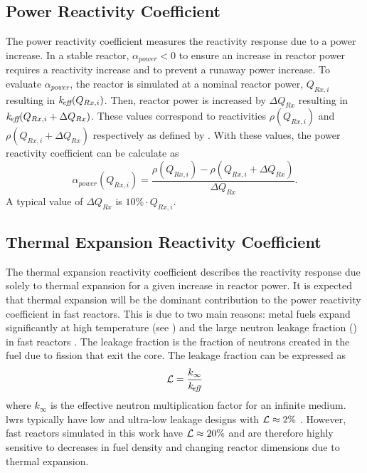   \subsection{Power Reactivity Coefficient}
  \label{sec:power_reactivity_coefficient}
    The power reactivity coefficient measures the reactivity response due to a
    power increase. In a stable reactor, $\alpha_{power} < 0$ to ensure an
    increase in reactor power requires a reactivity increase and to prevent a
    runaway power increase. To evaluate $\alpha_{power}$, the reactor is
    simulated at a nominal reactor power, $Q_{Rx,i}$ resulting in
    $k_{\!\mbox{\scriptsize \em eff}}(Q_{Rx,i})$. Then, reactor power is increased by $\Delta Q_{Rx}$
    resulting in $k_{\!\mbox{\scriptsize \em eff}}(Q_{Rx,i} + \Delta Q_{Rx})$. These \keff values
    correspond to reactivities $\rho(Q_{Rx,i})$ and ${\rho(Q_{Rx,i} + \Delta
    Q_{Rx})}$ respectively as defined by . With these
    values, the power reactivity coefficient can be calculate as
    \begin{equation}
      \label{eq:power_reactivity_coefficient}
      \alpha_{power}(Q_{Rx,i}) = \frac{\rho(Q_{Rx,i}) - \rho(Q_{Rx,i} + 
        \Delta Q_{Rx})} {\Delta Q_{Rx}}.
    \end{equation}
    A typical value of $\Delta Q_{Rx}$ is $10\% \cdot Q_{Rx,i}$.

  \subsection{Thermal Expansion Reactivity Coefficient}
  \label{sec:thermal_expansion_reactivity_coefficent}
    The thermal expansion reactivity coefficient describes the reactivity 
    response due solely to thermal expansion for a given increase in reactor 
    power. It is expected that thermal expansion will be the dominant 
    contribution to the power reactivity coefficient in fast reactors. This is 
    due to two main reasons: metal fuels expand significantly at high 
    temperature (see ) and the large neutron leakage 
    fraction (\leakage) in fast reactors \cite{PlentifulEnergy}. The leakage 
    fraction is the fraction of neutrons created in the fuel due to fission that 
    exit the core. The leakage fraction can be expressed as
    \begin{equation}
      \label{eq:leakage}
      \mathcal{L} = \frac{k_{\infty}}{k_{\!\mbox{\scriptsize \em eff}}}
    \end{equation}
    where $k_{\infty}$ is the effective neutron multiplication factor for an
    infinite medium. \glspl{lwr} typically have low and ultra-low leakage
    designs with $\mathcal{L} \approx 2 \%$ \cite{textbookknief}. However, fast
    reactors simulated in this work have $\mathcal{L} \approx 20\%$ and are
    therefore highly sensitive to decreases in fuel density and changing reactor
    dimensions due to thermal expansion.

